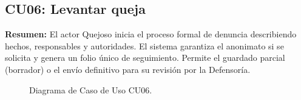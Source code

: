 \begin{appendices}
\subsection{CU06: Levantar queja}

\textbf{Resumen:} 
El actor Quejoso inicia el proceso formal de denuncia describiendo hechos, responsables y autoridades. El sistema garantiza el anonimato si se solicita y genera un folio único de seguimiento. Permite el guardado parcial (borrador) o el envío definitivo para su revisión por la Defensoría.

\begin{figure}[htbp]
    \centering
    \figCUseis
    \caption{Diagrama de Caso de Uso CU06.}
    \label{fig:cu06}
\end{figure}


\end{appendices}
